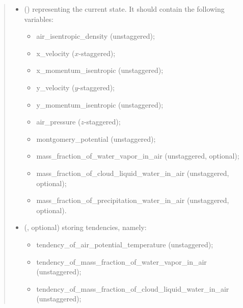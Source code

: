\documentclass[letterpaper,10pt,english]{sphinxmanual}
\begin{document}
\begin{fulllineitems}
\begin{fulllineitems}
\begin{quote}
\begin{description}
\begin{itemize}
\item {} 
 () \textendash{} 
{\hyperref[\detokenize{api:storages.state_isentropic.StateIsentropic}]{}} representing the current state.
It should contain the following variables:
\begin{itemize}
\item {} 
air\_isentropic\_density (unstaggered);

\item {} 
x\_velocity (\(x\)-staggered);

\item {} 
x\_momentum\_isentropic (unstaggered);

\item {} 
y\_velocity (\(y\)-staggered);

\item {} 
y\_momentum\_isentropic (unstaggered);

\item {} 
air\_pressure (\(z\)-staggered);

\item {} 
montgomery\_potential (unstaggered);

\item {} 
mass\_fraction\_of\_water\_vapor\_in\_air (unstaggered, optional);

\item {} 
mass\_fraction\_of\_cloud\_liquid\_water\_in\_air (unstaggered, optional);

\item {} 
mass\_fraction\_of\_precipitation\_water\_in\_air (unstaggered, optional).

\end{itemize}


\item {} 
 (, optional) \textendash{} 
{\hyperref[\detokenize{api:storages.grid_data.GridData}]{}} storing tendencies, namely:
\begin{itemize}
\item {} 
tendency\_of\_air\_potential\_temperature (unstaggered);

\item {} 
tendency\_of\_mass\_fraction\_of\_water\_vapor\_in\_air (unstaggered);

\item {} 
tendency\_of\_mass\_fraction\_of\_cloud\_liquid\_water\_in\_air (unstaggered);


\end{itemize}
\end{itemize}
\end{description}
\end{quote}
\end{fulllineitems}
\end{fulllineitems}
\end{document}
